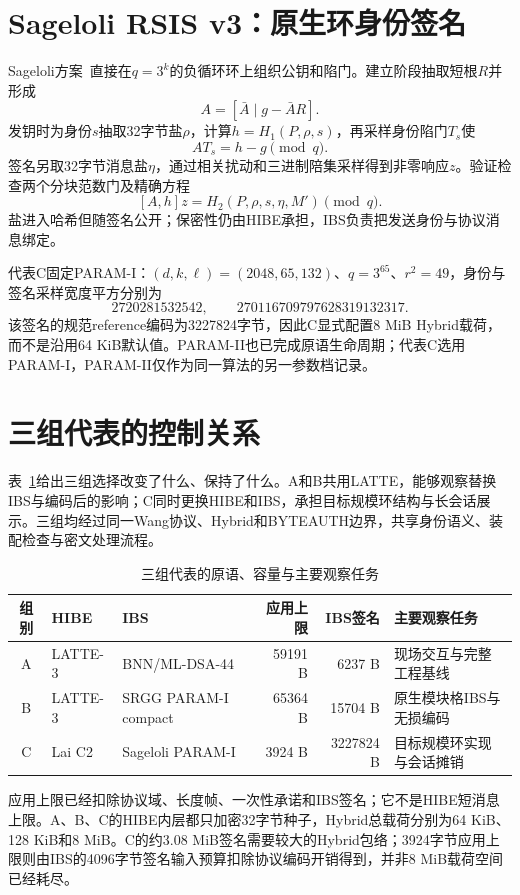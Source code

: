 \documentclass[UTF8,a4paper,12pt,oneside,openany,fontset=fandol]{ctexrep}
\begin{document}
\section{Sageloli RSIS v3：原生环身份签名}
Sageloli方案~\cite{sageloli2023ibs}直接在$q=3^k$的负循环环上组织公钥和陷门。建立阶段抽取短根$R$并形成
\[
  A=[\bar A\mid g-\bar A R].
\]
发钥时为身份$s$抽取32字节盐$\rho$，计算$h=H_1(P,\rho,s)$，再采样身份陷门$T_s$使
\[
  AT_s=h-g\pmod q.
\]
签名另取32字节消息盐$\eta$，通过相关扰动和三进制陪集采样得到非零响应$z$。验证检查两个分块范数门及精确方程
\[
  [A,h]z=H_2(P,\rho,s,\eta,M')\pmod q.
\]
盐进入哈希但随签名公开；保密性仍由HIBE承担，IBS负责把发送身份与协议消息绑定。

代表C固定PARAM-I：$(d,k,\ell)=(2048,65,132)$、$q=3^{65}$、$r^2=49$，身份与签名采样宽度平方分别为
\[
  2720281532542,
  \qquad
  270116709797628319132317.
\]
该签名的规范reference编码为3227824字节，因此C显式配置8 MiB Hybrid载荷，而不是沿用64 KiB默认值。PARAM-II也已完成原语生命周期；代表C选用PARAM-I，PARAM-II仅作为同一算法的另一参数档记录。

\section{三组代表的控制关系}
表~\ref{tab:representative-control}给出三组选择改变了什么、保持了什么。A和B共用LATTE，能够观察替换IBS与编码后的影响；C同时更换HIBE和IBS，承担目标规模环结构与长会话展示。三组均经过同一Wang协议、Hybrid和BYTEAUTH边界，共享身份语义、装配检查与密文处理流程。

\begin{table}[htbp]
\centering
\small
\caption{三组代表的原语、容量与主要观察任务}
\label{tab:representative-control}
\begin{tabularx}{\textwidth}{@{}c>{\raggedright\arraybackslash}p{}>{\raggedright\arraybackslash}p{}rr>{\raggedright\arraybackslash}X@{}}
\toprule
\rowcolor{black!8} 组别 & HIBE & IBS & 应用上限 & IBS签名 & 主要观察任务 \\
\midrule
A & LATTE-3 & BNN/ML-DSA-44 & 59191 B & 6237 B & 现场交互与完整工程基线 \\
B & LATTE-3 & SRGG PARAM-I compact & 65364 B & 15704 B & 原生模块格IBS与无损编码 \\
C & Lai C2 & Sageloli PARAM-I & 3924 B & 3227824 B & 目标规模环实现与会话摊销 \\
\bottomrule
\end{tabularx}
\end{table}

应用上限已经扣除协议域、长度帧、一次性承诺和IBS签名；它不是HIBE短消息上限。A、B、C的HIBE内层都只加密32字节种子，Hybrid总载荷分别为64 KiB、128 KiB和8 MiB。C的约3.08 MiB签名需要较大的Hybrid包络；3924字节应用上限则由IBS的4096字节签名输入预算扣除协议编码开销得到，并非8 MiB载荷空间已经耗尽。
\end{document}
